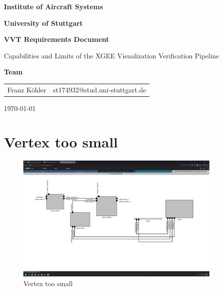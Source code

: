 \documentclass{article}
\begin{document}
\begin{titlepage}
    \centering
    \par\vspace{2cm}

    {\Large \textbf{Institute of Aircraft Systems} \par}
    \vspace{0.5cm}
    {\large \textbf{University of Stuttgart} \par}
    \vspace{3cm}

    {\large \textbf{VVT Requirements Document} \par}
    {\large Capabilities and Limits of the XGEE Visualization Verification Pipeline \par}
    {\large  \par}
    \vspace{3cm}

    {\large \textbf{Team} \par}
    \vspace{0.5cm}
    \begin{tabular}{ll}
    Franz Köhler & st174932@stud.uni-stuttgart.de \\
    \end{tabular}
    \par\vspace{3cm}

    {\large \today \par}
\end{titlepage}

\tableofcontents %

\newpage %

\section{Vertex too small}
\begin{figure}[H]
    \centering
    \includegraphics[width=0.9\textwidth]{images/vertex_too_small.png}
    \caption{Vertex too small}
\end{figure}
\newpage
\end{document}
